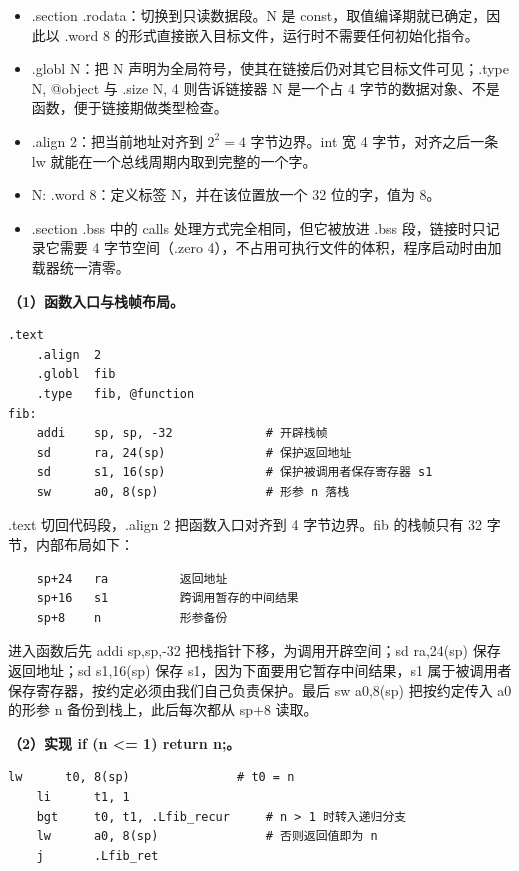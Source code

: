 \documentclass[UTF8,a4paper,10pt]{ctexart}
\newcommand{\hfour}[1]{\par\vspace{0.55em}\noindent{\bfseries #1}\par\vspace{0.25em}}
\begin{document}
\begin{itemize}
  \item .section .rodata：切换到只读数据段。N 是 const，取值编译期就已确定，因此以 .word 8 的形式直接嵌入目标文件，运行时不需要任何初始化指令。
  \item .globl N：把 N 声明为全局符号，使其在链接后仍对其它目标文件可见；.type N, @object 与 .size N, 4 则告诉链接器 N 是一个占 4 字节的数据对象、不是函数，便于链接期做类型检查。
  \item .align 2：把当前地址对齐到 $2^2=4$ 字节边界。int 宽 4 字节，对齐之后一条 lw 就能在一个总线周期内取到完整的一个字。
  \item N: .word 8：定义标签 N，并在该位置放一个 32 位的字，值为 8。
  \item .section .bss 中的 calls 处理方式完全相同，但它被放进 .bss 段，链接时只记录它需要 4 字节空间（.zero 4），不占用可执行文件的体积，程序启动时由加载器统一清零。
\end{itemize}

\hfour{3. 函数 fib}

\textbf{（1）函数入口与栈帧布局。}

\begin{lstlisting}[language=riscv]
    .text
    .align  2
    .globl  fib
    .type   fib, @function
fib:
    addi    sp, sp, -32             # 开辟栈帧
    sd      ra, 24(sp)              # 保护返回地址
    sd      s1, 16(sp)              # 保护被调用者保存寄存器 s1
    sw      a0, 8(sp)               # 形参 n 落栈
\end{lstlisting}

.text 切回代码段，.align 2 把函数入口对齐到 4 字节边界。fib 的栈帧只有 32 字节，内部布局如下：

\begin{lstlisting}
    sp+24   ra          返回地址
    sp+16   s1          跨调用暂存的中间结果
    sp+8    n           形参备份
\end{lstlisting}

进入函数后先 addi sp,sp,-32 把栈指针下移，为调用开辟空间；sd ra,24(sp) 保存返回地址；sd s1,16(sp) 保存 s1，因为下面要用它暂存中间结果，s1 属于被调用者保存寄存器，按约定必须由我们自己负责保护。最后 sw a0,8(sp) 把按约定传入 a0 的形参 n 备份到栈上，此后每次都从 sp+8 读取。

\textbf{（2）实现 if (n <= 1) return n;。}

\begin{lstlisting}[language=riscv]
    lw      t0, 8(sp)               # t0 = n
    li      t1, 1
    bgt     t0, t1, .Lfib_recur     # n > 1 时转入递归分支
    lw      a0, 8(sp)               # 否则返回值即为 n
    j       .Lfib_ret
\end{lstlisting}
\end{document}
